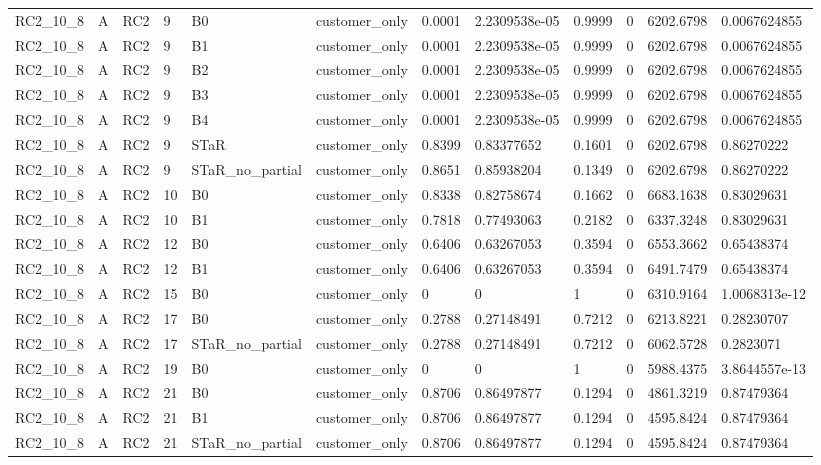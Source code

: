 \begin{longtable}{llllllllllll}
RC2\_10\_8 & A & RC2 & 9 & B0 & customer\_only & 0.0001 & 2.2309538e-05 & 0.9999 & 0 & 6202.6798 & 0.0067624855 \\
RC2\_10\_8 & A & RC2 & 9 & B1 & customer\_only & 0.0001 & 2.2309538e-05 & 0.9999 & 0 & 6202.6798 & 0.0067624855 \\
RC2\_10\_8 & A & RC2 & 9 & B2 & customer\_only & 0.0001 & 2.2309538e-05 & 0.9999 & 0 & 6202.6798 & 0.0067624855 \\
RC2\_10\_8 & A & RC2 & 9 & B3 & customer\_only & 0.0001 & 2.2309538e-05 & 0.9999 & 0 & 6202.6798 & 0.0067624855 \\
RC2\_10\_8 & A & RC2 & 9 & B4 & customer\_only & 0.0001 & 2.2309538e-05 & 0.9999 & 0 & 6202.6798 & 0.0067624855 \\
RC2\_10\_8 & A & RC2 & 9 & STaR & customer\_only & 0.8399 & 0.83377652 & 0.1601 & 0 & 6202.6798 & 0.86270222 \\
RC2\_10\_8 & A & RC2 & 9 & STaR\_no\_partial & customer\_only & 0.8651 & 0.85938204 & 0.1349 & 0 & 6202.6798 & 0.86270222 \\
RC2\_10\_8 & A & RC2 & 10 & B0 & customer\_only & 0.8338 & 0.82758674 & 0.1662 & 0 & 6683.1638 & 0.83029631 \\
RC2\_10\_8 & A & RC2 & 10 & B1 & customer\_only & 0.7818 & 0.77493063 & 0.2182 & 0 & 6337.3248 & 0.83029631 \\
RC2\_10\_8 & A & RC2 & 12 & B0 & customer\_only & 0.6406 & 0.63267053 & 0.3594 & 0 & 6553.3662 & 0.65438374 \\
RC2\_10\_8 & A & RC2 & 12 & B1 & customer\_only & 0.6406 & 0.63267053 & 0.3594 & 0 & 6491.7479 & 0.65438374 \\
RC2\_10\_8 & A & RC2 & 15 & B0 & customer\_only & 0 & 0 & 1 & 0 & 6310.9164 & 1.0068313e-12 \\
RC2\_10\_8 & A & RC2 & 17 & B0 & customer\_only & 0.2788 & 0.27148491 & 0.7212 & 0 & 6213.8221 & 0.28230707 \\
RC2\_10\_8 & A & RC2 & 17 & STaR\_no\_partial & customer\_only & 0.2788 & 0.27148491 & 0.7212 & 0 & 6062.5728 & 0.2823071 \\
RC2\_10\_8 & A & RC2 & 19 & B0 & customer\_only & 0 & 0 & 1 & 0 & 5988.4375 & 3.8644557e-13 \\
RC2\_10\_8 & A & RC2 & 21 & B0 & customer\_only & 0.8706 & 0.86497877 & 0.1294 & 0 & 4861.3219 & 0.87479364 \\
RC2\_10\_8 & A & RC2 & 21 & B1 & customer\_only & 0.8706 & 0.86497877 & 0.1294 & 0 & 4595.8424 & 0.87479364 \\
RC2\_10\_8 & A & RC2 & 21 & STaR\_no\_partial & customer\_only & 0.8706 & 0.86497877 & 0.1294 & 0 & 4595.8424 & 0.87479364 \\

\end{longtable}
